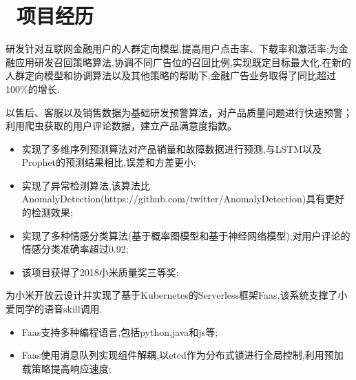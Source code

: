 \documentclass{resume}
\begin{document}

\section{\faUsers\ 项目经历}

\begin{onehalfspacing}
研发针对互联网金融用户的人群定向模型,提高用户点击率、下载率和激活率;为金融应用研发召回策略算法,协调不同广告位的召回比例,实现既定目标最大化.在新的人群定向模型和协调算法以及其他策略的帮助下,金融广告业务取得了同比超过100\%的增长.
\end{onehalfspacing}


\begin{onehalfspacing}
以售后、客服以及销售数据为基础研发预警算法，对产品质量问题进行快速预警；利用爬虫获取的用户评论数据，建立产品满意度指数。
\begin{itemize}
  \item 实现了多维序列预测算法对产品销量和故障数据进行预测,与LSTM以及Prophet的预测结果相比,误差和方差更小;
  \item 实现了异常检测算法,该算法比AnomalyDetection(https://github.com/twitter/AnomalyDetection)具有更好的检测效果;
  \item 实现了多种情感分类算法(基于概率图模型和基于神经网络模型),对用户评论的情感分类准确率超过0.92;
  \item 该项目获得了2018小米质量奖三等奖;
\end{itemize}
\end{onehalfspacing}


\begin{onehalfspacing}
为小米开放云设计并实现了基于Kubernetes的Serverless框架Faas,该系统支撑了小爱同学的语音skill调用.
\begin{itemize}
  \item Faas支持多种编程语言,包括python,java和js等;
  \item Faas使用消息队列实现组件解耦,以etcd作为分布式锁进行全局控制,利用预加载策略提高响应速度;
\end{itemize}
\end{onehalfspacing}
\end{document}
